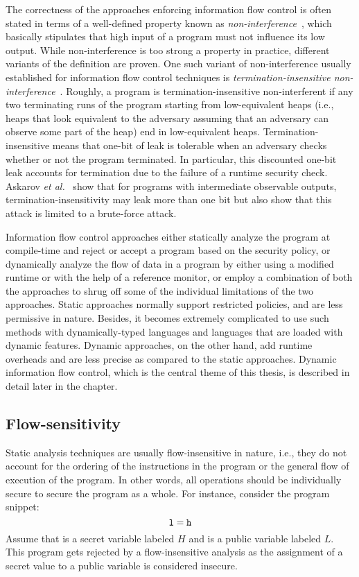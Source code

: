 The correctness of the approaches enforcing information flow control
is often stated in terms of a well-defined property known 
as \emph{non-interference}~\cite{goguen}, which basically stipulates
that high input of a program must not influence its low output. While
non-interference is too strong a property in practice, different
variants of the definition are proven. One such variant of
non-interference usually established for information flow control
techniques is \emph{termination-insensitive
  non-interference}~\cite{volpano}. Roughly, a program is
termination-insensitive non-interferent if any two terminating runs 
of the program starting from low-equivalent heaps (i.e., heaps that
look equivalent to the adversary assuming that an adversary can
observe some part of the heap) end in low-equivalent
heaps. Termination-insensitive means that one-bit of leak is tolerable
when an adversary checks whether or not the program terminated. In
particular, this discounted one-bit leak accounts for termination due
to the failure of a runtime security  check. Askarov \emph{et
al.}~\cite{askarov} show that for programs with intermediate observable
outputs, termination-insensitivity may leak more than one bit but also
show that this attack is limited to a brute-force attack. 

Information flow control approaches either statically analyze the
program at compile-time and reject or accept a program based on the
security policy, or dynamically analyze the flow of data in a program
by either using a modified runtime or with the help of a reference
monitor, or employ a combination of both the approaches to shrug off 
some of the individual limitations of the two approaches. Static approaches
normally support restricted policies, and are less permissive in
nature. Besides, it becomes extremely complicated to use such methods
with dynamically-typed languages and languages that are loaded with
dynamic features. Dynamic approaches, on the other hand, add runtime
overheads and are less precise as compared to the static
approaches. Dynamic information flow control, which is the central
theme of this thesis, is described in detail later in the
chapter. 

\subsection{Flow-sensitivity}
Static analysis techniques are usually flow-insensitive in
nature, i.e., they do not account for the ordering of the instructions
in the program or the general flow of execution of the program. In
other words, all operations should be individually secure to secure
the program as a whole. 
For instance, consider the program snippet:
$$\texttt{l} = \texttt{h} $$
Assume that  is a secret variable labeled $H$
and  is a public variable labeled $L$. This program gets
rejected by a flow-insensitive analysis as the assignment of a secret
value to a public variable is considered insecure.  

